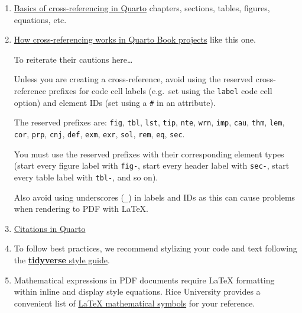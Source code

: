 \documentclass[
  11pt,
  letterpaper,
  twoside]{report}
\begin{document}
\newpage{}

\begin{enumerate}
\def\labelenumi{\arabic{enumi}.}
\setcounter{enumi}{2}
\item
  \href{https://quarto.org/docs/authoring/cross-references.html}{Basics
  of cross-referencing in Quarto} chapters, sections, tables, figures,
  equations, etc.
\item
  \href{https://quarto.org/docs/books/book-crossrefs.html}{How
  cross-referencing works in Quarto Book projects} like this one.

  To reiterate their cautions here\ldots{}

  \begin{tcolorbox}[enhanced jigsaw, coltitle=black, leftrule=.75mm, rightrule=.15mm, breakable, titlerule=0mm, bottomrule=.15mm, left=2mm, colbacktitle=quarto-callout-warning-color!10!white, arc=.35mm, toprule=.15mm, title=\textcolor{quarto-callout-warning-color}{\faExclamationTriangle}\hspace{0.5em}{Reserved prefixes for cross-referencing}, toptitle=1mm, colback=white, bottomtitle=1mm, opacitybacktitle=0.6, opacityback=0, colframe=quarto-callout-warning-color-frame]

  Unless you are creating a cross-reference, avoid using the reserved
  cross-reference prefixes for code cell labels (e.g.~set using the
  \texttt{label} code cell option) and element IDs (set using a
  \texttt{\#} in an attribute).

  The reserved prefixes are: \texttt{fig}, \texttt{tbl}, \texttt{lst},
  \texttt{tip}, \texttt{nte}, \texttt{wrn}, \texttt{imp}, \texttt{cau},
  \texttt{thm}, \texttt{lem}, \texttt{cor}, \texttt{prp}, \texttt{cnj},
  \texttt{def}, \texttt{exm}, \texttt{exr}, \texttt{sol}, \texttt{rem},
  \texttt{eq}, \texttt{sec}.

  You must use the reserved prefixes with their corresponding element
  types (start every figure label with \texttt{fig-}, start every header
  label with \texttt{sec-}, start every table label with \texttt{tbl-},
  and so on).

  Also avoid using underscores (\texttt{\_}) in labels and IDs as this
  can cause problems when rendering to PDF with LaTeX.

  \end{tcolorbox}
\item
  \href{https://quarto.org/docs/authoring/citations.html}{Citations in
  Quarto}
\item
  To follow best practices, we recommend stylizing your code and text
  following the \href{https://style.tidyverse.org}{\textbf{tidyverse}
  style guide}.
\item
  Mathematical expressions in PDF documents require LaTeX formatting
  within inline and display style equations. Rice University provides a
  convenient list of
  \href{https://www.cmor-faculty.rice.edu/~heinken/latex/symbols.pdf}{LaTeX
  mathematical symbols} for your reference.


\end{enumerate}
\end{document}
